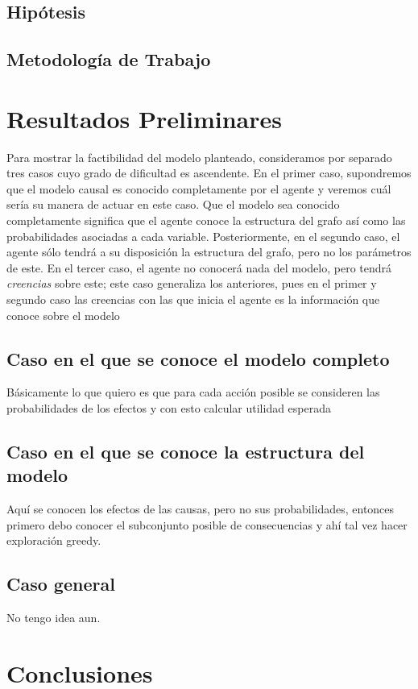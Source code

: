 \documentclass[11pt]{article}
\theoremstyle{plain}
\begin{document}
	\subsection{Hipótesis}
	\subsection{Metodología de Trabajo}

\section{Resultados Preliminares}
Para mostrar la factibilidad del modelo planteado, consideramos por separado tres casos cuyo grado de dificultad es ascendente. En el primer caso, supondremos que el modelo causal es conocido completamente por el agente y veremos cuál sería su manera de actuar en este caso. Que el modelo sea conocido completamente significa que el agente conoce la estructura del grafo así como las probabilidades asociadas a cada variable. Posteriormente, en el segundo caso, el agente sólo tendrá a su disposición la estructura del grafo, pero no los parámetros de este. En el tercer caso, el agente no conocerá nada del modelo, pero tendrá \textit{creencias} sobre este; este caso generaliza los anteriores, pues en el primer y segundo caso las creencias con las que inicia el agente es la información que conoce sobre el modelo
\subsection{Caso en el que se conoce el modelo completo}
Básicamente lo que quiero es que para cada acción posible se consideren las probabilidades de los efectos y con esto calcular utilidad esperada
\subsection{Caso en el que se conoce la estructura del modelo}
Aquí se conocen los efectos de las causas, pero no sus probabilidades, entonces primero debo conocer el subconjunto posible de consecuencias y ahí tal vez hacer exploración greedy.
\subsection{Caso general}
No tengo idea aun.
\section{Conclusiones}



\end{document}
